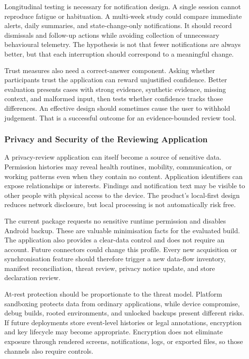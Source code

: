 Longitudinal testing is necessary for notification design. A single session cannot reproduce fatigue or habituation. A multi-week study could compare immediate alerts, daily summaries, and state-change-only notifications. It should record dismissals and follow-up actions while avoiding collection of unnecessary behavioural telemetry. The hypothesis is not that fewer notifications are always better, but that each interruption should correspond to a meaningful change.

Trust measures also need a correct-answer component. Asking whether participants trust the application can reward unjustified confidence. Better evaluation presents cases with strong evidence, synthetic evidence, missing context, and malformed input, then tests whether confidence tracks those differences. An effective design should sometimes cause the user to withhold judgement. That is a successful outcome for an evidence-bounded review tool.

\subsubsection{Privacy and Security of the Reviewing Application}

A privacy-review application can itself become a source of sensitive data. Permission histories may reveal health routines, mobility, communication, or working patterns even when they contain no content. Application identifiers can expose relationships or interests. Findings and notification text may be visible to other people with physical access to the device. The product's local-first design reduces network disclosure, but local processing is not automatically risk free.

The current package requests no sensitive runtime permission and disables Android backup. These are valuable minimisation facts for the evaluated build. The application also provides a clear-data control and does not require an account. Future connectors could change this profile. Every new acquisition or synchronisation feature should therefore trigger a new data-flow inventory, manifest reconciliation, threat review, privacy notice update, and store declaration review.

At-rest protection should be proportionate to the threat model. Platform sandboxing protects data from ordinary applications, while device compromise, debug builds, rooted environments, and unlocked backups present different risks. If future deployments store event-level histories or legal annotations, encryption and key lifecycle may become appropriate. Encryption does not eliminate exposure through rendered screens, notifications, logs, or exported files, so those channels also require controls.

